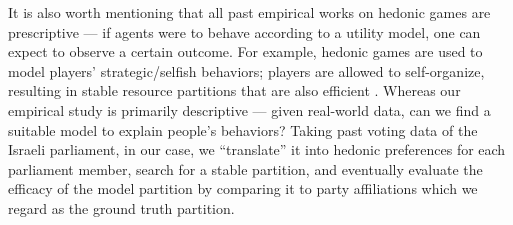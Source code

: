 It is also worth mentioning that all past empirical works on hedonic games are
prescriptive --- if agents were to behave according to a utility model, one can
expect to observe a certain outcome.
For example, hedonic games are used to model players' strategic/selfish behaviors;
players are allowed to self-organize, resulting in stable resource partitions that
are also efficient \cite{5674046, 5137409, 6846512}.
Whereas our empirical study is primarily descriptive --- given real-world data,
can we find a suitable model to explain people's behaviors?
Taking past voting data of the Israeli parliament, in our case, we ``translate''
it into hedonic preferences for each parliament member, search for a stable
partition, and eventually evaluate the efficacy of the model partition by
comparing it to party affiliations which we regard as the ground truth partition.
